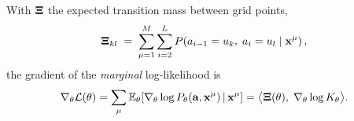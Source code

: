 
\begin{proposition}
\label{prop:fisher}
With $\mathbf{\Xi}$ the expected transition mass between grid points,
\begin{equation}
\label{eq:xi}
\mathbf{\Xi}_{kl} \;=\; \sum_{\mu=1}^{M}\sum_{i=2}^{L}
P\!\left(a_{i-1}=u_{k},\; a_i=u_{l} \;\middle|\; \mathbf{x}^\mu\right),
\end{equation}
the gradient of the \emph{marginal} log-likelihood is
\begin{equation}
\label{eq:fisher}
\nabla_\theta \mathcal{L}(\theta)
= \sum_{\mu}\mathbb{E}_\theta\!\left[\nabla_\theta \log P_\theta(\mathbf{a},\mathbf{x}^\mu)\,\middle|\,\mathbf{x}^\mu\right]
= \big\langle \mathbf{\Xi}(\theta),\; \nabla_\theta \log K_{\theta} \big\rangle .
\end{equation}
\end{proposition}
